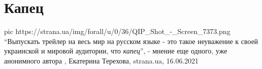  
 
 
 
 
\chapter{Капец}
\label{sec:slova.kapec}

\ifcmt
  pic https://strana.ua/img/forall/u/0/36/QIP_Shot_-_Screen_7373.png
\fi
\enquote{Выпускать трейлер на весь мир на русском языке - это такое неуважение к своей
украинской и мировой аудитории, что \emph{капец}}, - мнение еще одного, уже анонимного
автора
, 
Екатерина Терехова, strana.ua, 16.06.2021
